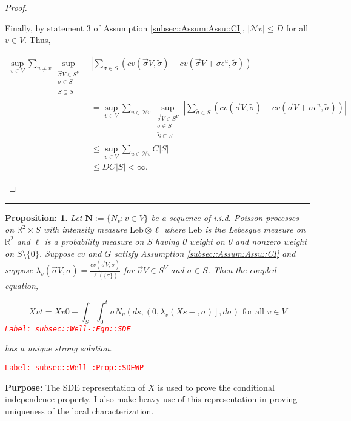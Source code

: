 \documentclass[12pt]{article}
\newcommand{\mb}{\mathbb}
\newcommand{\mc}{\mathcal}
\newcommand{\te}{\text}
\newcommand{\ep}{\epsilon}
\newcommand{\tr}{\textcolor{red}}
\newcommand{\labe}[1]{\tr{\texttt{Label: #1}}}
\newcommand{\purpose}{\textbf{Purpose: }}
\newcommand{\lin}{\rule{\linewidth}{0.4 pt}}
\newcommand{\defeq}{:=}								%
\renewcommand{\v}{v}							%
\newcommand{\vv}{u}								%
\renewcommand{\S}{S}							%
\newcommand{\s}{\sigma}							%
\newcommand{\sv}{\vec{\s}}						%
\newcommand{\ev}[1]{\ep^{#1}}					%
\renewcommand{\t}{t}							%
\renewcommand{\tt}{s}							%
\newcommand{\X}{X}								%
\newcommand{\IGr}{c}							%
\newcommand{\neigh}{\mc{N}}						%
\renewcommand{\ss}[1]{^{#1}}					%
\newcommand{\degr}{D}								%
\newcommand{\poiss}[1]{N_{#1}}						%
\newcommand{\poisses}{\mathbf{N}}				%
\newcommand{\leb}{\te{Leb}}							%
\renewcommand{\SS}{\tilde{\S}}						%
\renewcommand{\ss}{\tilde{\s}}					%
\newcommand{\XState}[1]{\S^{#1}}				%
\newcommand{\rate}[1]{\lambda_{#1}}					%
\newcommand{\const}[1]{C_{#1}}						%
\newcommand{\Sm}{\ell}								%
\newtheorem{prop}[thms]{Proposition: }
\begin{document}
\begin{proof}
\begin{enumerate}[i)]
Finally, by statement 3 of Assumption \ref{subsec::Assum:Assu::CI}, \(|\neigh{\v}| \leq \degr\) for all \(\v \in  V\). Thus,

\begin{align*}
\sup_{\v\in  V}\sum_{\vv \neq \v} \sup_{\substack{\sv{}{ V} \in \S^ V\\ \s\in \S\\ \SS\subseteq \S}}& \left|\sum_{\ss \in \SS} (\IGr{\v}(\sv{}{ V},\ss) - \IGr{\v}(\sv{}{ V}+\s\ev{\vv},\ss))\right|\\
&  = \sup_{\v\in  V}\sum_{\vv\in \neigh{\v}} \sup_{\substack{\sv{}{ V} \in \S^ V\\ \s\in \S\\ \SS\subseteq \S}} \left|\sum_{\ss \in \SS} (\IGr{\v}(\sv{}{ V},\ss) - \IGr{\v}(\sv{}{ V}+\s\ev{\vv},\ss))\right|\\
&\leq \sup_{\v\in  V} \sum_{\vv \in \neigh{\v}} \const{}|\S|\\
&\leq \degr \const{}|\S| < \infty.
\end{align*}


\end{enumerate}
\end{proof}

\lin

\begin{prop}
Let \(\poisses \defeq \{\poiss{\v}:\v\in  V\}\) be a sequence of i.i.d. Poisson processes on \(\mb{R}^2\times \S\) with intensity measure \(\leb\otimes \Sm\) where \(\leb\) is the Lebesgue measure on \(\mb{R}^2\) and \(\Sm\) is a probability measure on \(\S\) having 0 weight on 0 and nonzero weight on \(\S\setminus \{0\}\). Suppose \(\IGr{\v}\) and \(G\) satisfy Assumption \ref{subsec::Assum:Assu::CI} and suppose \(\rate{\v}(\sv{}{ V},\s) = \frac{\IGr{\v}(\sv{}{ V},\s)}{\Sm(\{\s\})}\) for \(\sv{}{ V} \in \S^ V\) and \(\s \in \S\). Then the coupled equation,

\begin{equation}
\X{\v}{\t} = \X{\v}{0} + \int_\S\int_0^\t \s\poiss{\v}\left(d\tt,\left(0,\rate{\v}(\X{}{\tt-},\s)\right],d\s\right) \te{ for all }\v \in  V
\label{subsec::Well-:Eqn::SDE}
\end{equation}
\labe{subsec::Well-:Eqn::SDE}

has a unique strong solution.
\label{subsec::Well-:Prop::SDEWP}
\end{prop}
\labe{subsec::Well-:Prop::SDEWP}

\purpose The SDE representation of \(\X{}{}\) is used to prove the conditional independence property. I also make heavy use of this representation in proving uniqueness of the local characterization.
\end{document}
